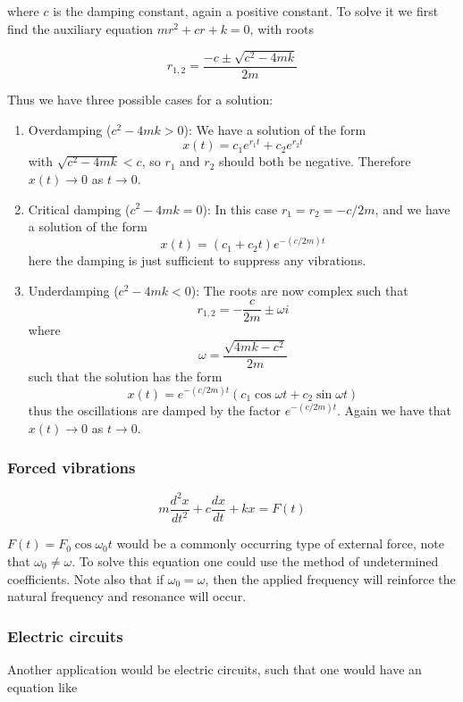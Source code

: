 \documentclass[a4paper]{article}
\begin{document}
where $c$ is the damping constant, again a positive constant. To solve it we first find the auxiliary equation $mr^2+cr+k=0$, with roots

\begin{equation}
    r_{1,2}=\frac{-c\pm\sqrt{c^2-4mk}}{2m}
\end{equation}

Thus we have three possible cases for a solution:

\begin{enumerate}
    \item Overdamping ($c^2-4mk>0$): We have a solution of the form $$x(t)=c_1e^{r_1t}+c_2e^{r_2t}$$ with $\sqrt{c^2-4mk}<c$, so $r_1$ and $r_2$ should both be negative. Therefore $x(t)\rightarrow 0$ as $t\rightarrow 0$.
    \item Critical damping ($c^2-4mk=0$): In this case $r_1=r_2=-c/2m$, and we have a solution of the form $$x(t)=(c_1+c_2t)e^{-(c/2m)t}$$ here the damping is just sufficient to suppress any vibrations.
    \item Underdamping ($c^2-4mk<0$): The roots are now complex such that $$r_{1,2}=-\frac{c}{2m}\pm\omega i$$ where $$\omega=\frac{\sqrt{4mk-c^2}}{2m}$$ such that the solution has the form $$x(t)=e^{-(c/2m)t}(c_1\cos\omega t+c_2\sin\omega t)$$ thus the oscillations are damped by the factor $e^{-(c/2m)t}$. Again we have that $x(t)\rightarrow 0$ as $t\rightarrow 0$.
\end{enumerate}


\subsubsection*{Forced vibrations}

\begin{equation}
    m\frac{d^2x}{dt^2}+c\frac{dx}{dt}+kx=F(t)
\end{equation}

$F(t)=F_0\cos\omega_0 t$ would be a commonly occurring type of external force, note that $\omega_0\not=\omega$. To solve this equation one could use the method of undetermined coefficients. Note also that if $\omega_0=\omega$, then the applied frequency will reinforce the natural frequency and resonance will occur.

\subsubsection*{Electric circuits}

Another application would be electric circuits, such that one would have an equation like
\end{document}
